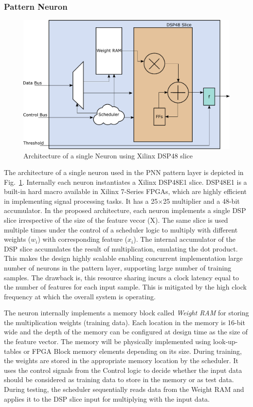 \subsubsection{\bf Pattern Neuron}
\begin{figure}[t]
\centering
   \includegraphics[height=0.6\columnwidth]{Figures/neuron.pdf}
   \caption{Architecture of a single Neuron using Xilinx DSP48 slice}
   \label{fig:neuron}
\end{figure}
The architecture of a single neuron used in the PNN pattern layer is depicted in Fig.~\ref{fig:neuron}.
Internally each neuron instantiates a Xilinx DSP48E1 slice.
DSP48E1 is a built-in hard macro available in Xilinx 7-Series FPGAs, which are highly efficient in implementing signal processing tasks.
It has a 25$\times$25 multiplier and a 48-bit accumulator.
In the proposed architecture, each neuron implements a single DSP slice irrespective of the size of the feature vecor (X).
The same slice is used multiple times under the control of a scheduler logic to multiply with different weights ($w_{i}$) with corresponding feature ($x_{i}$).
The internal accumulator of the DSP slice accumulates the result of multiplication, emulating the dot product.
This makes the design highly scalable enabling concurrent implementation large number of neurons in the pattern layer, supporting large number of training samples.
The drawback is, this resource sharing incurs a clock latency equal to the number of features for each input sample.
This is mitigated by the high clock frequency at which the overall system is operating.

The neuron internally implements a memory block called \emph{Weight RAM} for storing the multiplication weights (training data).
Each location in the memory is 16-bit wide and the depth of the memory can be configured at design time as the size of the feature vector.
The memory will be physically implemented using look-up-tables or FPGA Block memory elements depending on its size.
During training, the weights are stored in the appropriate memory location by the scheduler.
It uses the control signals from the Control logic to decide whether the input data should be considered as training data to store in the memory or as test data.
During testing, the scheduler sequentially reads data from the Weight RAM and applies it to the DSP slice input for multiplying with the input data.

